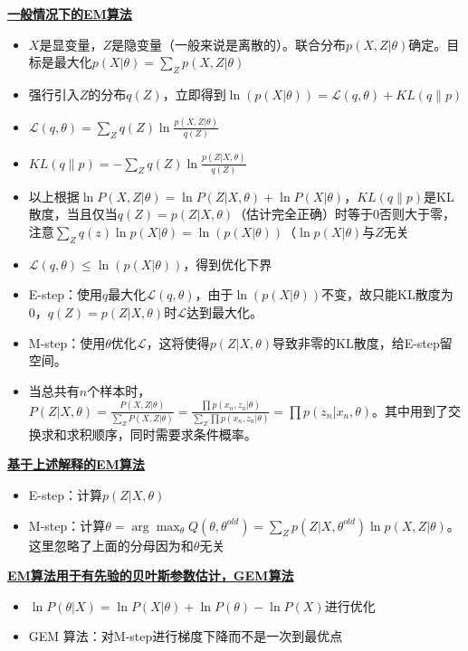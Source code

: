 \documentclass[UTF8,a4paper,landscape,compress]{paper}
\renewcommand{\subsection}[1]{{\small\textbf{\underline{#1}}}\\ }
\newcommand{\List}[1]{\begin{itemize}[fullwidth,itemindent=0em] #1 \end{itemize}}
\begin{document}
\begin{multicols}{4}
\subsection{一般情况下的EM算法}
\List{
    \item {$X$是显变量，$Z$是隐变量（一般来说是离散的）。联合分布$p(X,Z|\theta)$确定。目标是最大化$p(X|\theta) = \sum_Zp(X,Z|\theta)$}
    \item {强行引入$Z$的分布$q(Z)$，立即得到$\ln(p(X|\theta)) = \mathcal L(q,\theta) + KL(q\|p)$}
    \item {$\mathcal L(q,\theta) = \sum_Zq(Z)\ln\frac{p(X,Z|\theta)}{q(Z)}$}
    \item {$KL(q\|p) = -\sum_Zq(Z)\ln\frac{p(Z|X,\theta)}{q(Z)}$}
    \item {以上根据$\ln P(X,Z|\theta) = \ln P(Z|X,\theta) + \ln P(X|\theta)$，$KL(q\|p)$是KL散度，当且仅当$q(Z) = p(Z|X,\theta)$（估计完全正确）时等于0否则大于零，注意$\sum_Zq(z)\ln p(X|\theta) = \ln(p(X|\theta))$（$\ln p(X|\theta)$与$Z$无关}
    \item {$\mathcal L(q,\theta) \le \ln(p(X|\theta))$，得到优化下界}
    \item {E-step：使用$q$最大化$\mathcal L(q,\theta)$，由于$\ln(p(X|\theta))$不变，故只能KL散度为0，$q(Z) = p(Z|X,\theta)$时$\mathcal L$达到最大化。}
    \item {M-step：使用$\theta$优化$\mathcal L$，这将使得$p(Z|X,\theta)$导致非零的KL散度，给E-step留空间。}
    \item {当总共有$n$个样本时，$P(Z|X,\theta) = \frac{P(X,Z|\theta)}{\sum_ZP(X,Z|\theta)} = \frac{\prod p(x_n,z_n|\theta)}{\sum_Z\prod p(x_n,z_n|\theta)} = \prod p(z_n|x_n,\theta)$。其中用到了交换求和求积顺序，同时需要求条件概率。}
}
\subsection{基于上述解释的EM算法}
\List{
    \item {E-step：计算$p(Z|X,\theta)$}
    \item {M-step：计算$\theta = \arg\max_{\theta}Q(\theta,\theta^{old}) = \sum_Zp(Z|X,\theta^{old})\ln p(X,Z|\theta)$。这里忽略了上面的分母因为和$\theta$无关}
}
\subsection{EM算法用于有先验的贝叶斯参数估计，GEM算法}
\List{
    \item {$\ln P(\theta|X) = \ln P(X|\theta) + \ln P(\theta) - \ln P(X)$进行优化}
    \item {GEM 算法：对M-step进行梯度下降而不是一次到最优点}
}

\end{multicols}
\end{document}
